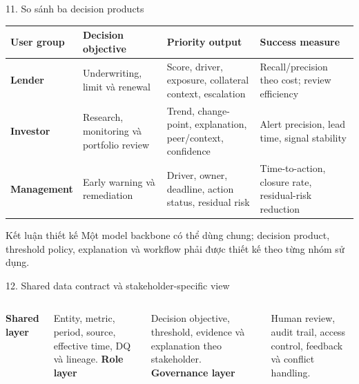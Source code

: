 \documentclass[aspectratio=169,11pt]{beamer}
\begin{document}
\begin{frame}{11. So sánh ba decision products}
  \scriptsize
  \renewcommand{\arraystretch}{1.45}
  \begin{tabularx}{\textwidth}{>{\bfseries}p{} p{} X p{}}
    User group & Decision objective & Priority output & Success measure\\\midrule
    Lender & Underwriting, limit và renewal & Score, driver, exposure, collateral context, escalation & Recall/precision theo cost; review efficiency\\
    Investor & Research, monitoring và portfolio review & Trend, change-point, explanation, peer/context, confidence & Alert precision, lead time, signal stability\\
    Management & Early warning và remediation & Driver, owner, deadline, action status, residual risk & Time-to-action, closure rate, residual-risk reduction\\
  \end{tabularx}
  \vfill
  \begin{block}{Kết luận thiết kế}
    Một model backbone có thể dùng chung; decision product, threshold policy, explanation và workflow phải được thiết kế theo từng nhóm sử dụng.
  \end{block}
\end{frame}

\begin{frame}{12. Shared data contract và stakeholder-specific view}
  \centering
  \vspace{.7em}
  \begin{columns}[T,totalwidth=\textwidth]
    \centering\textbf{Shared layer}\par\small Entity, metric, period, source, effective time, DQ và lineage.
    \centering\textbf{Role layer}\par\small Decision objective, threshold, evidence và explanation theo stakeholder.
    \centering\textbf{Governance layer}\par\small Human review, audit trail, access control, feedback và conflict handling.
  \end{columns}
\end{frame}
\end{document}
